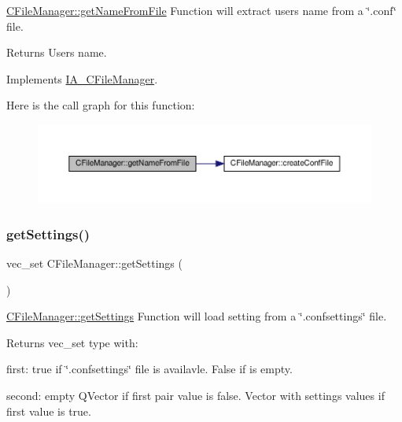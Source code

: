 \hyperlink{classCFileManager_afe80a483037c156eaa4fd6ee7fb51b29}{C\+File\+Manager\+::get\+Name\+From\+File} Function will extract user\textquotesingle{}s name from a \char`\"{}.\+conf\char`\"{} file. 

\begin{DoxyReturn}{Returns}
User\textquotesingle{}s name. 
\end{DoxyReturn}


Implements \hyperlink{classIA__CFileManager}{I\+A\+\_\+\+C\+File\+Manager}.

Here is the call graph for this function\+:
\nopagebreak
\begin{figure}[H]
\begin{center}
\leavevmode
\includegraphics[width=350pt]{classCFileManager_afe80a483037c156eaa4fd6ee7fb51b29_cgraph}
\end{center}
\end{figure}
\mbox{\label{classCFileManager_aa9590dcd3148754780c9e1fd8926e21d}} 
\subsubsection{\texorpdfstring{get\+Settings()}{getSettings()}}
{\footnotesize\ttfamily vec\+\_\+set C\+File\+Manager\+::get\+Settings (\begin{DoxyParamCaption}{ }\end{DoxyParamCaption})\hspace{0.3cm}{\ttfamily [virtual]}}



\hyperlink{classCFileManager_aa9590dcd3148754780c9e1fd8926e21d}{C\+File\+Manager\+::get\+Settings} Function will load setting from a \char`\"{}.\+confsettings\char`\"{} file. 

\begin{DoxyReturn}{Returns}
vec\+\_\+set type with\+:
\begin{DoxyItemize}
\item first\+: true if \char`\"{}.\+confsettings\char`\"{} file is availavle. False if is empty.
\item second\+: empty Q\+Vector if first pair value is false. Vector with setting\textquotesingle{}s values if first value is true. 
\end{DoxyItemize}
\end{DoxyReturn}


